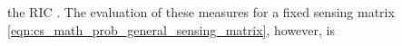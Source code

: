 the \ac{RIC}
\cite{article:FoucartACHA2010,article:CandesCRAS2008,article:CandesSPM2008}.
The evaluation of
these measures for
a fixed sensing matrix
\eqref{eqn:cs_math_prob_general_sensing_matrix}, however, is

